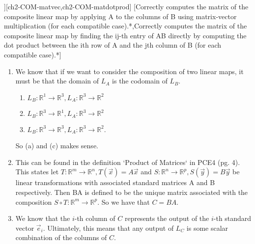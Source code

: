 \begin{SaveQuestion}
{\begin{enumerate}
        \end{enumerate} }
][ch2-COM-matvec,ch2-COM-matdotprod]
    [Correctly computes the matrix of the composite linear map by applying A to the columns of B using matrix-vector multiplication (for each compatible case).*,Correctly computes the matrix of the composite linear map by finding the ij-th entry of AB directly by computing the dot product between the ith row of A and the jth column of B (for each compatible case).*]
    \begin{enumerate}
        \item We know that if we want to consider the composition of two linear maps, it must be that the domain of $L_A$ is the codomain of $L_B$. 
        \begin{enumerate}
            \item $L_B: \mathbb{R}^1 \rightarrow \mathbb{R}^3, L_A: \mathbb{R}^3 \rightarrow \mathbb{R}^2$
            \item $L_B: \mathbb{R}^3 \rightarrow \mathbb{R}^1, L_A: \mathbb{R}^3 \rightarrow \mathbb{R}^2$
            \item $L_B: \mathbb{R}^3 \rightarrow \mathbb{R}^3, L_A: \mathbb{R}^3 \rightarrow \mathbb{R}^2$.
        \end{enumerate}
        So (a) and (c) makes sense. 

        \item This can be found in the definition `Product of Matrices` in PCE4 (pg. 4). This states let $T: \mathbb{R}^m \rightarrow \mathbb{R}^n, T(\vec x) = A\vec x$ and $S: \mathbb{R}^n \rightarrow \mathbb{R}^p, S(\vec y) = B\vec y$ be linear transformations with associated standard matrices A and B respectively. Then BA is defined to be the unique matrix associated with the composition $S \circ T: \mathbb{R}^m \rightarrow \mathbb{R}^p$. So we have that $C = BA$. 

        \item We know that the $i$-th column of $C$ represents the output of the $i$-th standard vector $\vec e_i$. Ultimately, this means that any output of $L_C$ is some scalar combination of the columns of $C$. 


\end{enumerate}
\end{SaveQuestion}
